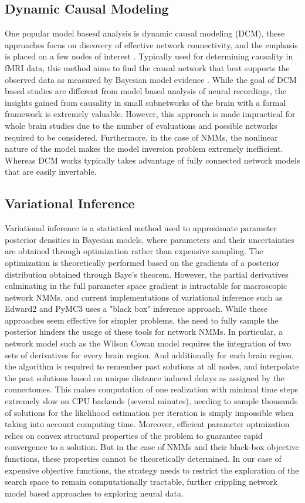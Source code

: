 \subsection{Dynamic Causal Modeling}
One popular model basesd analysis is dynamic causal modeling (DCM), these approaches focus on discovery of effective network connectivity, and the emphasis is placed on a few nodes of interest \cite{friston_network_2011}. Typically used for determining causality in fMRI data, this method aims to find the causal network that best supports the observed data as measured by Bayesian model evidence \cite{stephan_nonlinear_2008}. While the goal of DCM based studies are different from model based analysis of neural recordings, the insights gained from causality in small subnetworks of the brain with a formal framework is extremely valuable. However, this approach is made impractical for whole brain studies due to the number of evaluations and possible networks required to be considered. Furthermore, in the case of NMMs, the nonlinear nature of the model makes the model inversion problem extremely inefficient. Whereas DCM works typically takes advantage of fully connected network models that are easily invertable. 

\subsection{Variational Inference}
Variational inference is a statistical method used to approximate parameter posterior densities in Bayesian models, where parameters and their uncertainties are obtained through optimization rather than expensive sampling. The optimization is theoretically performed based on the gradients of a posterior distribution obtained through Baye's theorem. However, the partial derivatives culminating in the full parameter space gradient is intractable for macroscopic network NMMs, and current implementations of variational inference such as Edward2 and PyMC3 uses a "black box" inference approach. While these approaches seem effective for simpler problems, the need to fully sample the posterior hinders the usage of these tools for network NMMs. In particular, a network model such as the Wilson Cowan model requires the integration of two sets of derivatives for every brain region. And additionally for each brain region, the algorithm is required to remember past solutions at all nodes, and interpolate the past solutions based on unique distance induced delays as assigned by the connectomes. This makes computation of one realization with minimal time steps extremely slow on CPU backends (several minutes), needing to sample thousands of solutions for the likelihood estimation per iteration is simply impossible when taking into account computing time. Moreover, efficient parameter optmization relies on convex structural properties of the problem to guarantee rapid convergence to a solution. But in the case of NMMs and their black-box objective functions, these properties cannot be theoretically determined. In our case of expensive objective functions, the strategy needs to restrict the exploration of the search space to remain computationally tractable, further crippling network model based approaches to exploring neural data.

